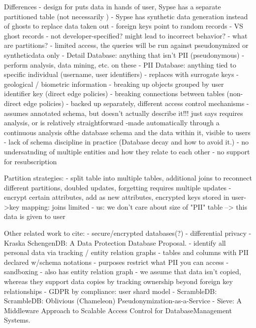 Differences
- design for \name puts data in hands of user, Sypse has a separate partitioned table (not
necessarily )
- Sypse has synthetic data generation instead of ghosts to replace data taken out
    - foreign keys point to random records
    - VS ghost records
    - not developer-specified? might lead to incorrect behavior?
- what are partitions?
    - limited access, the queries will be run against pseudonymized or syntheticdata only 
    - Detail Database: anything that isn't PII (pseudonymous)
        - perform analysis, data mining, etc. on these
    - PII Database: anything tied to specific individual (username, user identifiers)
        - replaces with surrogate keys
        - geological / biometric information
        - breaking up objects grouped by user identifier key (direct edge policies)
        - breaking connections between tables (non-direct edge policies)
    - backed up separately, different access control mechanisms
- assumes annotated schema, but doesn't actually describe it!!! just says requires analysis, or is
relatively straightforward
    -made automatically through a continuous analysis ofthe database schema and the data within it,
    visible to users
    - lack of schema discipline in practice (Database decay and how to avoid it.)
    - no undersatnding of multiple entities and how they relate to each other
- no support for resubscription

Partition strategies:
- split table into multiple tables, additional joins to reconnect different partitions, doubled updates, forgetting requires multiple
updates
- encrypt certain attributes, add as new attributes, encrypted keys stored in user->key mapping: joins limited
- us: we don't care about size of "PII" table --> this data is given to user

Other related work to cite: 
- secure/encrypted databases(?)
- differential privacy
- Kraska SchengenDB: A Data Protection Database Proposal.
    - identify all personal data via tracking / entity relation graphs
    - tables and columns with PII declared w/schema notations
    - purposes restrict what PII you can access
    - sandboxing
    - also has entity relation graph
    - we assume that data isn't copied, whereas they support data copies by tracking ownership
    beyond foreign key relationships
- GDPR by compliance: user shard model  
- ScrambleDB: ScrambleDB: Oblivious (Chameleon) Pseudonymization-as-a-Service
- Sieve: A Middleware Approach to Scalable Access Control for DatabaseManagement Systems. 

